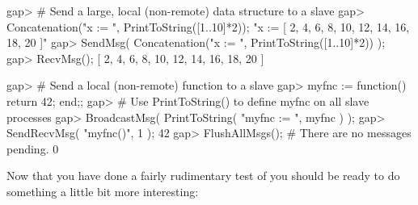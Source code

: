 gap> # Send a large, local (non-remote) data structure to a slave
gap> Concatenation("x := ", PrintToString([1..10]*2));            
"x := [ 2, 4, 6, 8, 10, 12, 14, 16, 18, 20 ]\n{}"
gap> SendMsg( Concatenation("x := ", PrintToString([1..10]*2)) ); 
gap> RecvMsg();                                                  
[ 2, 4, 6, 8, 10, 12, 14, 16, 18, 20 ]

gap> # Send a local (non-remote) function to a slave
gap> myfnc := function() return 42; end;;
gap> # Use PrintToString() to define myfnc on all slave processes
gap> BroadcastMsg( PrintToString( "myfnc := ", myfnc ) );
gap> SendRecvMsg( "myfnc()", 1 );
42
gap> FlushAllMsgs(); # There are no messages pending.
0
\endexample

Now that you have done a fairly rudimentary test of {\ParGAP} you  should
be ready to do something a little bit more interesting:

